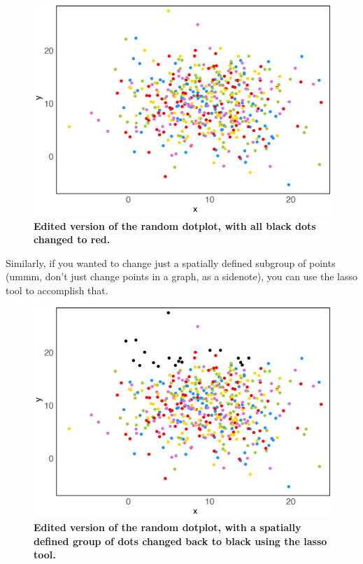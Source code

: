 \documentclass[]{article}
\begin{document}
\begin{figure}
\centering
\includegraphics{RandomDotplot_edited.png}
\caption{\textbf{Edited version of the random dotplot, with all black
dots changed to red.}}
\end{figure}

Similarly, if you wanted to change just a spatially defined subgroup of
points (ummm, don't just change points in a graph, as a sidenote), you
can use the lasso tool to accomplish that.

\begin{figure}
\centering
\includegraphics{RandomDotplot_edited2.png}
\caption{\textbf{Edited version of the random dotplot, with a spatially
defined group of dots changed back to black using the lasso tool.}}
\end{figure}
\end{document}

